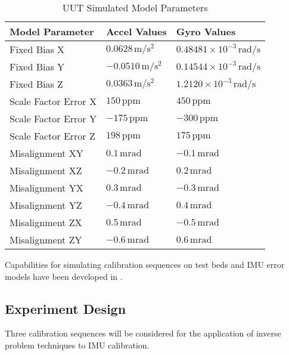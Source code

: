 \begin{table}[h!]
	\centering
	\begin{tabular}{|p{4cm}|p{3.5cm}|p{3.5cm}|}
		\hline
		\textbf{Model Parameter} & \textbf{Accel Values} & \textbf{Gyro Values} \\ \hline
		Fixed Bias X & $0.0628 \,\unit{\meter\per\second\squared}$ & $0.48481 \times 10^{-3} \,\unit{\radian\per\second}$ \\ \hline
		Fixed Bias Y & $-0.0510 \,\unit{\meter\per\second\squared}$ & $0.14544 \times 10^{-3}  \,\unit{\radian\per\second}$ \\ \hline
		Fixed Bias Z & $0.0363 \,\unit{\meter\per\second\squared}$ & $1.2120 \times 10^{-3}  \,\unit{\radian\per\second}$ \\ \hline
		Scale Factor Error X & $150 \,\textrm{ppm}$ & $450 \,\textrm{ppm}$ \\ \hline
		Scale Factor Error Y & $-175 \,\textrm{ppm}$ & $-300 \,\textrm{ppm}$ \\ \hline
		Scale Factor Error Z & $198 \,\textrm{ppm}$ & $175 \,\textrm{ppm}$ \\ \hline
		Misalignment XY & $0.1 \,\unit{\milli\radian}$ & $-0.1 \,\unit{\milli\radian}$ \\ \hline
		Misalignment XZ & $-0.2 \,\unit{\milli\radian}$ & $0.2 \,\unit{\milli\radian}$ \\ \hline
		Misalignment YX & $0.3 \,\unit{\milli\radian}$ & $-0.3 \,\unit{\milli\radian}$ \\ \hline
		Misalignment YZ & $-0.4 \,\unit{\milli\radian}$ & $0.4 \,\unit{\milli\radian}$ \\ \hline
		Misalignment ZX & $0.5 \,\unit{\milli\radian}$ & $-0.5 \,\unit{\milli\radian}$ \\ \hline
		Misalignment ZY & $-0.6 \,\unit{\milli\radian}$ & $0.6 \,\unit{\milli\radian}$ \\ \hline
	\end{tabular}
	\caption{UUT Simulated Model Parameters}
	\label{tab: UUT simulated model parameters}
\end{table}
\FloatBarrier

Capabilities for simulating calibration sequences on test beds and IMU error models have been developed in \MATLAB. 


\subsection{Experiment Design}

Three calibration sequences will be considered for the application of inverse problem techniques to IMU calibration. 

